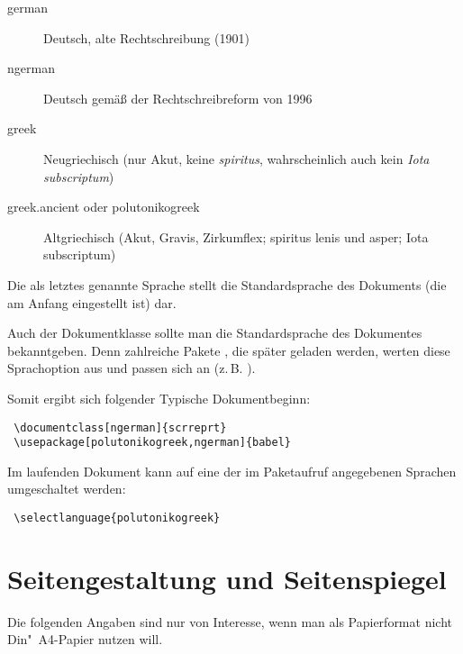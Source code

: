 \begin{description}
 \item[german] Deutsch, alte Rechtschreibung (1901)
 \item[ngerman] Deutsch gemäß der Rechtschreibreform von 1996
 \item[greek] Neugriechisch (nur Akut, keine \emph{spiritus}, wahrscheinlich auch kein \emph{Iota subscriptum})
 \item[greek.ancient oder polutonikogreek] Altgriechisch (Akut, Gravis, Zirkumflex; spiritus lenis und asper; Iota subscriptum)
\end{description}

Die als letztes genannte Sprache stellt die Standardsprache des Dokuments (die am Anfang
eingestellt ist) dar.

Auch der Dokumentklasse sollte man die Standardsprache des Dokumentes bekanntgeben.
Denn zahlreiche Pakete , die später geladen werden, werten diese Sprachoption aus und 
passen sich an (z.\,B. ).

Somit ergibt sich folgender Typische Dokumentbeginn:

\begin{lstlisting}
 \documentclass[ngerman]{scrreprt}
 \usepackage[polutonikogreek,ngerman]{babel}
\end{lstlisting}


Im laufenden Dokument kann auf eine der im Paketaufruf angegebenen Sprachen umgeschaltet werden:

\begin{lstlisting} 
 \selectlanguage{polutonikogreek}
\end{lstlisting}






\section{Seitengestaltung und Seitenspiegel}
\label{komaskript}
 

Die folgenden Angaben sind nur von Interesse, wenn man als Papierformat nicht Din"~A4-Papier 
nutzen will.

